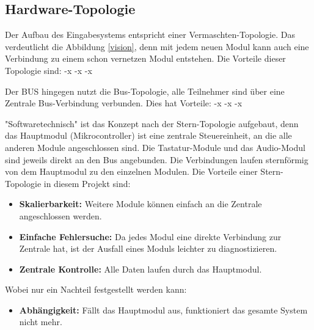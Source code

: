  
 \subsection{Hardware-Topologie}
 Der Aufbau des Eingabesystems entspricht einer Vermaschten-Topologie. Das verdeutlicht die Abbildung \ref{vision}, denn mit jedem neuen Modul kann auch eine Verbindung zu einem schon vernetzen Modul entstehen. Die Vorteile dieser Topologie sind:
 -x
 -x
 -x
 
 Der BUS hingegen nutzt die Bus-Topologie, alle Teilnehmer sind über eine Zentrale Bus-Verbindung verbunden. Dies hat Vorteile:
 -x
 -x
 -x
 
 
 
 
"Softwaretechnisch" ist das Konzept nach der Stern-Topologie aufgebaut, denn das Hauptmodul (Mikrocontroller) ist eine zentrale Steuereinheit, an die alle anderen Module angeschlossen sind. Die Tastatur-Module und das Audio-Modul sind jeweils direkt an den Bus angebunden. Die Verbindungen laufen sternförmig von dem Hauptmodul zu den einzelnen Modulen. Die Vorteile einer Stern-Topologie in diesem Projekt sind:
\begin{itemize}
    \item \textbf{Skalierbarkeit:} Weitere Module können einfach an die Zentrale angeschlossen werden.
    \item \textbf{Einfache Fehlersuche:} Da jedes Modul eine direkte Verbindung zur Zentrale hat, ist der Ausfall eines Moduls leichter zu diagnostizieren.
    \item \textbf{Zentrale Kontrolle:} Alle Daten laufen durch das Hauptmodul.
\end{itemize}
Wobei nur ein Nachteil festgestellt werden kann:
\begin{itemize}
    \item \textbf{Abhängigkeit:} Fällt das Hauptmodul aus, funktioniert das gesamte System nicht mehr.
\end{itemize}
